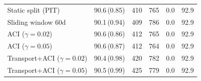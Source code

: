 \begin{table}[t]
\begin{tabular}{lccccc}
\quad Static split (PIT) & 90.6\,(0.85) & 410 & 765 & 0.0 & 92.9 \\
\quad Sliding window 60d & 90.1\,(0.94) & 409 & 786 & 0.0 & 92.9 \\
\quad ACI ($\gamma{=}0.02$) & 90.6\,(0.86) & 412 & 765 & 0.0 & 92.9 \\
\quad ACI ($\gamma{=}0.05$) & 90.6\,(0.87) & 412 & 764 & 0.0 & 92.9 \\
\quad Transport+ACI ($\gamma{=}0.02$) & 90.4\,(0.98) & 420 & 782 & 0.0 & 92.9 \\
\quad Transport+ACI ($\gamma{=}0.05$) & 90.5\,(0.99) & 425 & 779 & 0.0 & 92.9 \\
\bottomrule
\end{tabular}
\end{table}
